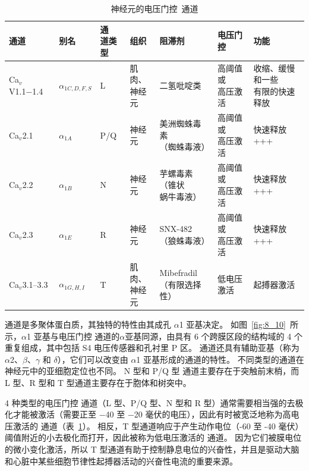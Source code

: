 \begin{table}[htbp]
	\caption{神经元的电压门控~通道} \label{tab:15_1} \centering
	\begin{tabular}{lllllll}
		\toprule
		通道 & 别名 & \makecell[l]{\ce{Ca^2+}通\\道类型}  & 组织 & 阻滞剂 & 电压门控 & 功能\\
		\midrule
		Ca$_v$V1.1−1.4 & $\alpha_{1C,D,F,S}$ & L & \makecell[l]{肌肉、\\神经元} & 二氢吡啶类 & \makecell[l]{高阈值或\\高压激活} & \makecell[l]{收缩、缓慢和一些\\有限的快速释放} \\
		Ca$_v$2.1 & $\alpha_{1A}$ & P/Q & 神经元 & \makecell[l]{美洲蜘蛛毒素\\（蜘蛛毒液）} & \makecell[l]{高阈值或\\高压激活} & 快速释放 +++ \\
		Ca$_v$2.2 & $\alpha_{1B}$ & N & 神经元 & \makecell[l]{芋螺毒素（锥状\\蜗牛毒液）} & \makecell{高阈值或\\高压激活} & 快速释放+++ \\
		Ca$_v$2.3 & $\alpha_{1E}$ & R & 神经元 & \makecell[l]{SNX-482\\（狼蛛毒液）} & \makecell[l]{高阈值或\\高压激活} & 快速释放 +++ \\
		Ca$_v$3.1–3.3 & $\alpha_{1G,H,I}$ & T & \makecell[l]{肌肉、\\神经元} & \makecell[l]{Mibefradil\\（有限选择性）} & 低电压激活 & 起搏器激活 \\
		\bottomrule
	\end{tabular}
\end{table}


通道是多聚体蛋白质，其独特的特性由其成孔 $\alpha$1 亚基决定。
如图~\ref{fig:8_10}~所示，$\alpha$1 亚基与电压门控  通道的$\alpha$亚基同源，由具有 6 个跨膜区段的结构域的 4 个重复组成，其中包括 S4 电压传感器和孔衬里 P 区。
通道还具有辅助亚基（称为 $\alpha$2、$\beta$、$\gamma$ 和 $\delta$），它们可以改变由 $\alpha$1 亚基形成的通道的特性。
不同类型的通道在神经元中的亚细胞定位也不同。
N 型和 P/Q 型  通道主要存在于突触前末梢，而 L 型、R 型和 T 型通道主要存在于胞体和树突中。


4 种类型的电压门控  通道（L 型、P/Q 型、N 型和 R 型）通常需要相当强的去极化才能被激活（需要正至 −40 至 −20 毫伏的电压），因此有时被宽泛地称为高电压激活的  通道（表~\ref{tab:15_1}）。
相反，T 型通道响应于产生动作电位（-60 至 -40 毫伏）阈值附近的小去极化而打开，因此被称为低电压激活的  通道。
因为它们被膜电位的微小变化激活，所以 T 型通道有助于控制静息电位的兴奋性，并且是驱动大脑和心脏中某些细胞节律性起搏器活动的兴奋性电流的重要来源。


